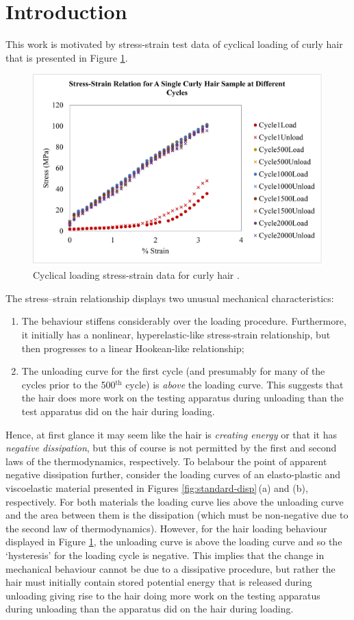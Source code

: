 \documentclass{article}
\begin{document}
\section{Introduction}
This work is motivated by stress-strain test data of cyclical loading of curly hair that is presented in Figure \ref{fig:data}.
\begin{figure}[!htb]
	\centering
	\includegraphics[width=0.6\linewidth]{hair-evolution}
	\caption{Cyclical loading stress-strain data for curly hair \cite{ngoepe2021evolving}.}
	\label{fig:data}
\end{figure}
The stress--strain relationship displays two unusual mechanical characteristics:
\begin{enumerate}
	\item The behaviour stiffens considerably over the loading procedure. Furthermore, it initially has a nonlinear, hyperelastic-like stress-strain relationship, but then progresses to a linear Hookean-like relationship;
	\item The unloading curve for the first cycle (and presumably for many of the cycles prior to the 500$^{\text{th}}$ cycle) is \textit{above} the loading curve. This suggests that the hair does more work on the testing apparatus during unloading than the test apparatus did on the hair during loading.
\end{enumerate}
Hence, at first glance it may seem like the hair is \textit{creating energy} or that it has \textit{negative dissipation}, but this of course is not permitted by the first and second laws of the thermodynamics, respectively. To belabour the point of apparent negative dissipation further, consider the loading curves of an elasto-plastic and viscoelastic material presented in Figures \ref{fig:standard-disp}\,(a) and (b), respectively.
For both materials the loading curve lies above the unloading curve and the area between them is the dissipation (which must be non-negative due to the second law of thermodynamics). However, for the hair loading behaviour displayed in Figure \ref{fig:data}, the unloading curve is above the loading curve and so the `hysteresis' for the loading cycle is negative. This implies that the change in mechanical behaviour cannot be due to a dissipative procedure, but rather the hair must initially contain stored potential energy that is released during unloading giving rise to the hair doing more work on the testing apparatus during unloading than the apparatus did on the hair during loading.
\end{document}
